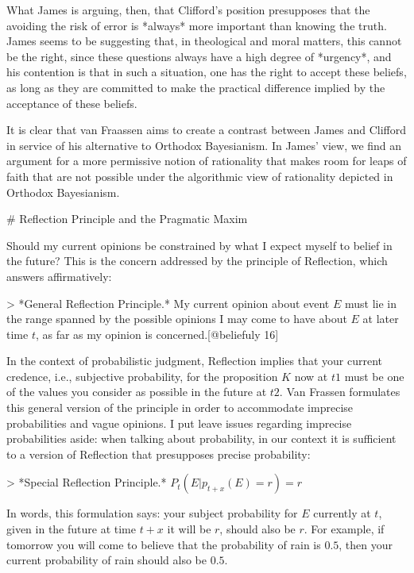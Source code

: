 What James is arguing, then, that Clifford's position presupposes that
the avoiding the risk of error is *always* more important than knowing
the truth. James seems to be suggesting that, in theological and moral
matters, this cannot be the right, since these questions always have a
high degree of *urgency*, and his contention is that in such a
situation, one has the right to accept these beliefs, as long as they
are committed to make the practical difference implied by the acceptance
of these beliefs.

It is clear that van Fraassen aims to create a contrast between James
and Clifford in service of his alternative to Orthodox Bayesianism. In
James' view, we find an argument for a more permissive notion of
rationality that makes room for leaps of faith that are not possible
under the algorithmic view of rationality depicted in Orthodox
Bayesianism.

\# Reflection Principle and the Pragmatic Maxim

Should my current opinions be constrained by what I expect myself to
belief in the future? This is the concern addressed by the principle of
Reflection, which answers affirmatively:

\textgreater{} *General Reflection Principle.* My current opinion about
event \(E\) must lie in the range spanned by the possible opinions I may
come to have about \(E\) at later time \(t\), as far as my opinion is
concerned.{[}@beliefuly 16{]}

In the context of probabilistic judgment, Reflection implies that your
current credence, i.e., subjective probability, for the proposition
\(K\) now at \(t1\) must be one of the values you consider as possible
in the future at \(t2\). Van Frassen formulates this general version of
the principle in order to accommodate imprecise probabilities and vague
opinions. I put leave issues regarding imprecise probabilities aside:
when talking about probability, in our context it is sufficient to a
version of Reflection that presupposes precise probability:

\textgreater{} *Special Reflection Principle.*
\(P_t(E|p_{t+x} (E) = r)=r\)

In words, this formulation says: your subject probability for \(E\)
currently at \(t\), given in the future at time \(t+x\) it will be
\(r\), should also be \(r\). For example, if tomorrow you will come to
believe that the probability of rain is \(0.5\), then your current
probability of rain should also be \(0.5\).

